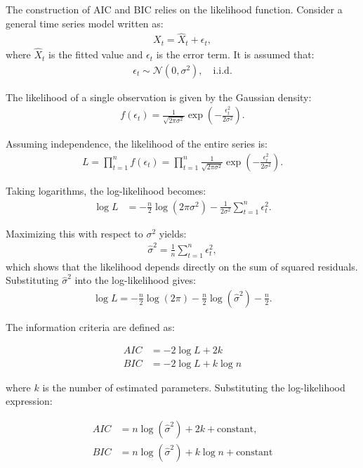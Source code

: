 \documentclass[10pt,a4paper]{article}
\begin{document}
	The construction of AIC and BIC relies on the likelihood function. Consider a general time series model written as:
	\begin{align*}
	X_t = \hat{X}_t + \epsilon_t,
	\end{align*}
	where $\hat{X}_t$ is the fitted value and $\epsilon_t$ is the error term. It is assumed that:
	\begin{align*}
	\epsilon_t \sim \mathcal{N}(0,\sigma^2), \quad \text{i.i.d.}
	\end{align*}
	
	The likelihood of a single observation is given by the Gaussian density:
	\begin{align*}
	f(\epsilon_t) = \frac{1}{\sqrt{2\pi\sigma^2}} \exp\left(-\frac{\epsilon_t^2}{2\sigma^2}\right).
	\end{align*}
	
	Assuming independence, the likelihood of the entire series is:
	\begin{align*}
	L = \prod_{t=1}^{n} f(\epsilon_t)
	= \prod_{t=1}^{n} \frac{1}{\sqrt{2\pi\sigma^2}} \exp\left(-\frac{\epsilon_t^2}{2\sigma^2}\right).
	\end{align*}
	
	Taking logarithms, the log-likelihood becomes:
	\begin{align*}
	\log L
	&= -\frac{n}{2}\log(2\pi\sigma^2) - \frac{1}{2\sigma^2}\sum_{t=1}^{n} \epsilon_t^2.
	\end{align*}
	
	Maximizing this with respect to $\sigma^2$ yields:
	\begin{align*}
	\hat{\sigma}^2 = \frac{1}{n} \sum_{t=1}^{n} \epsilon_t^2,
	\end{align*}
	which shows that the likelihood depends directly on the sum of squared residuals. Substituting $\hat{\sigma}^2$ into the log-likelihood gives:
	\begin{align*}
	\log L = -\frac{n}{2}\log(2\pi) - \frac{n}{2}\log(\hat{\sigma}^2) - \frac{n}{2}.
	\end{align*}
	
	The information criteria are defined as:
	
	\begin{align*}
	AIC &= -2 \log L + 2k \\
	BIC &= -2 \log L + k \log n
	\end{align*}
	
	where $k$ is the number of estimated parameters. Substituting the log-likelihood expression:
	
	\begin{align*}
	AIC &= n \log(\hat{\sigma}^2) + 2k + \text{constant}, \\
	BIC &= n \log(\hat{\sigma}^2) + k \log n + \text{constant}
	\end{align*}
	
\end{document}
